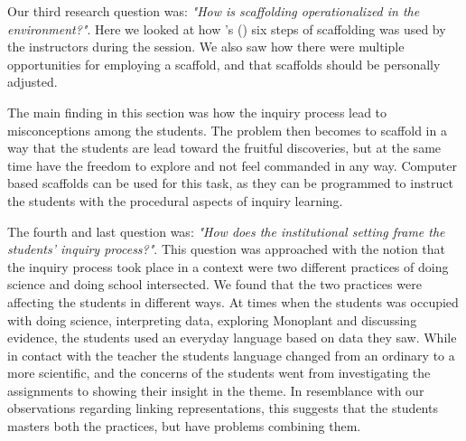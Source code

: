 
Our third research question was: \emph{"How is scaffolding operationalized in the environment?"}. Here we looked at how \citeauthor{wood1976role}'s (\citeyear{wood1976role}) six steps of scaffolding was used by the instructors during the session. We also saw how there were multiple opportunities for employing a scaffold, and that scaffolds should be personally adjusted. 

The main finding in this section was how the inquiry process lead to misconceptions among the students. The problem then becomes to scaffold in a way that the students are lead toward the fruitful discoveries, but at the same time have the freedom to explore and not feel commanded in any way. Computer based scaffolds can be used for this task, as they can be programmed to instruct the students with the procedural aspects of inquiry learning. 

The fourth and last question was: \emph{"How does the institutional setting frame the students' inquiry process?"}. This question was approached with the notion that the inquiry process took place in a context were two different practices of doing science and doing school intersected. We found that the two practices were affecting the students in different ways. At times when the students was occupied with doing science, interpreting data, exploring Monoplant and discussing evidence, the students used an everyday language based on data they saw. While in contact with the teacher the students language changed from an ordinary to a more scientific, and the concerns of the students went from investigating the assignments to showing their insight in the theme. In resemblance with our observations regarding linking representations, this suggests that the students masters both the practices, but have problems combining them.
